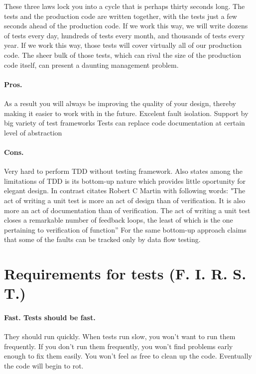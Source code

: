 These three laws lock you into a cycle that is perhaps thirty seconds long.
The tests and the production code are written together, with the tests just a few seconds ahead of the production code. 
If we work this way, we will write dozens of tests every day, hundreds of tests every month, and thousands of tests every year. 
If we work this way, those tests will cover virtually all of our production code. 
The sheer bulk of those tests, which can rival the size of the production code itself, can present a daunting management problem.\cite{MartinClean}

\paragraph{Pros.}
As a result you will always be improving the quality of your design, thereby making it easier to work with in the future.\cite{tdd}
Excelent fault isolation. Support by big variety of test frameworks \cite{STCraft}
Tests can replace code documentation at certain level of abstraction \cite{MartinClean}

\paragraph{Cons.}
Very hard to perform TDD without testing framework. \cite{STCraft}
Also \cite{STCraft} states among the limitations of TDD is its bottom-up nature which provides little oportunity for elegant design. In contrast \cite{tdd} citates Robert C Martin with following words: "The act of writing a unit test is more an act of design than of verification.  It is also more an act of documentation than of verification.  The act of writing a unit test closes a remarkable number of feedback loops, the least of which is the one pertaining to verification of function”  For the same bottom-up approach \cite{STCraft} claims that some of the faults can be tracked only by data flow testing.


\section{Requirements for tests (F. I. R. S. T.)}

\paragraph{Fast. Tests should be fast.} 
They should run quickly. When tests run slow, you won’t want to run them frequently. 
If you don’t run them frequently, you won’t find problems early enough to fix them easily. 
You won’t feel as free to clean up the code. Eventually the code will begin to rot.\cite{MartinClean}

